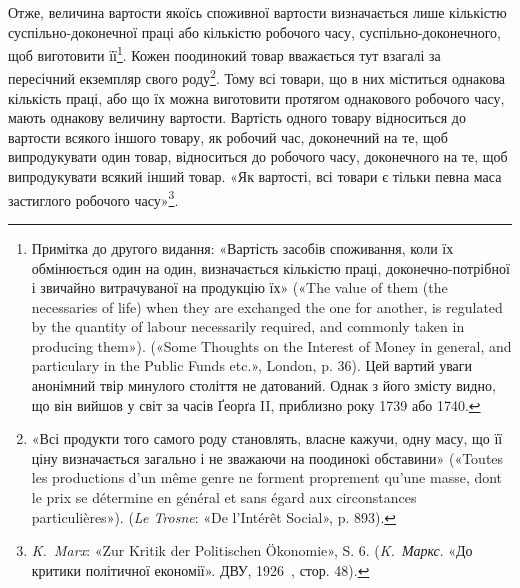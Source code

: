 Отже, величина вартости якоїсь споживної вартости визначається
лише кількістю суспільно-доконечної праці або кількістю
робочого часу, суспільно-доконечного, щоб виготовити
її\footnote{
Примітка до другого видання: «Вартість засобів споживання, коли
їх обмінюється один на один, визначається кількістю праці, доконечно-потрібної
і звичайно витрачуваної на продукцію їх» («The value of them
(the necessaries of life) when they are exchanged the one for another, is
regulated by the quantity of labour necessarily required, and commonly
taken in producing them»). («Some Thoughts on the Interest of Money in
general, and particulary in the Public Funds etc.», London, p. 36). Цей
вартий уваги анонімний твір минулого століття не датований. Однак
з його змісту видно, що він вийшов у світ за часів Ґеорґа II, приблизно
року 1739 або 1740.
}. Кожен поодинокий товар вважається тут взагалі за пересічний
екземпляр свого роду\footnote{
«Всі продукти того самого роду становлять, власне кажучи, одну
масу, що її ціну визначається загально і не зважаючи на поодинокі обставини»
(«Toutes les productions d’un même genre ne forment proprement
qu’une masse, dont le prix se détermine en général et sans égard aux circonstances
particulières»). (\emph{Le Trosne}: «De l’Intérêt Social», p. 893).
}. Тому всі товари, що в них міститься
однакова кількість праці, або що їх можна виготовити протягом
однакового робочого часу, мають однакову величину вартости.
Вартість одного товару відноситься до вартости всякого іншого
товару, як робочий час, доконечний на те, щоб випродукувати
один товар, відноситься до робочого часу, доконечного на те,
щоб випродукувати всякий інший товар. «Як вартості, всі товари
є тільки певна маса застиглого робочого часу»\footnote{
\emph{K.~Marx}: «Zur Kritik der Politischen Ökonomie», S. 6. (\emph{K.~Маркс}.
«До критики політичної економії». ДВУ, 1926~, стор. 48).
}.
